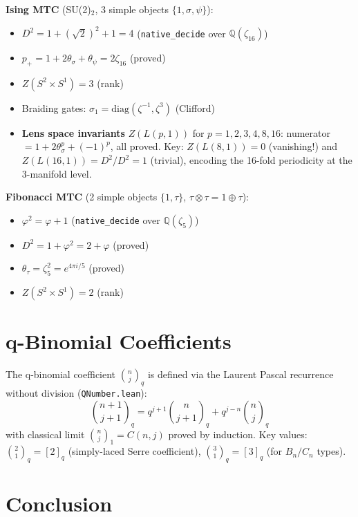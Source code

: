 \documentclass[aps,prl,twocolumn,superscriptaddress]{revtex4-2}
\newcommand{\lean}[1]{\texttt{#1}}
\newcommand{\nativedecide}{\texttt{native\_decide}}
\begin{document}
\textbf{Ising MTC} (SU(2)$_2$, 3 simple objects $\{1, \sigma, \psi\}$):
\begin{itemize}
  \item $D^2 = 1 + (\sqrt{2})^2 + 1 = 4$ \quad (\nativedecide{} over $\mathbb{Q}(\zeta_{16})$)
  \item $p_+ = 1 + 2\theta_\sigma + \theta_\psi = 2\zeta_{16}$ \quad (proved)
  \item $Z(S^2 \times S^1) = 3$ \quad (rank)
  \item Braiding gates: $\sigma_1 = \mathrm{diag}(\zeta^{-1}, \zeta^3)$ (Clifford)
  \item \textbf{Lens space invariants} $Z(L(p,1))$ for $p = 1,2,3,4,8,16$:
    numerator $= 1 + 2\theta_\sigma^p + (-1)^p$, all proved.
    Key: $Z(L(8,1)) = 0$ (vanishing!) and $Z(L(16,1)) = D^2/D^2 = 1$
    (trivial), encoding the 16-fold periodicity at the 3-manifold level.
\end{itemize}

\textbf{Fibonacci MTC} (2 simple objects $\{1, \tau\}$, $\tau \otimes \tau = 1 \oplus \tau$):
\begin{itemize}
  \item $\varphi^2 = \varphi + 1$ \quad (\nativedecide{} over $\mathbb{Q}(\zeta_5)$)
  \item $D^2 = 1 + \varphi^2 = 2 + \varphi$ \quad (proved)
  \item $\theta_\tau = \zeta_5^2 = e^{4\pi i/5}$ \quad (proved)
  \item $Z(S^2 \times S^1) = 2$ \quad (rank)
\end{itemize}

\section{q-Binomial Coefficients}

The q-binomial coefficient $\binom{n}{j}_q$ is defined via the
Laurent Pascal recurrence without division (\lean{QNumber.lean}):
\begin{equation}
  \binom{n{+}1}{j{+}1}_q = q^{j+1} \binom{n}{j{+}1}_q + q^{j-n} \binom{n}{j}_q
\end{equation}
with classical limit $\binom{n}{j}_1 = C(n,j)$ proved by induction.
Key values: $\binom{2}{1}_q = [2]_q$ (simply-laced Serre coefficient),
$\binom{3}{1}_q = [3]_q$ (for $B_n/C_n$ types).

\section{Conclusion}
\end{document}
